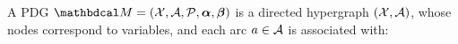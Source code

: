 \documentclass[twoside]{article}
\begin{document}
\begin{defn}
    A PDG $\dg M = (\X, \Ar, \mathcal P, \balpha, \bbeta )
    $
    is a directed hypergraph  $(\mathcal X, \mathcal A)$, whose nodes correspond to variables,
    and each arc
    $a \in \mathcal A$
    is associated with:
    \begin{itemize}[itemsep=0pt]

\end{itemize}
\end{defn}
\end{document}
